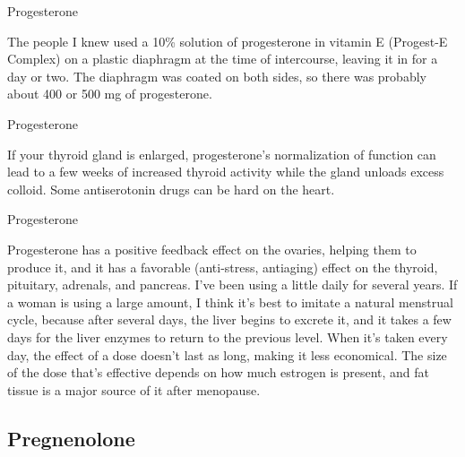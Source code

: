\documentclass[11pt,oneside,openany,extrafontsizes]{memoir}
\begin{document}
\begin{standalonequote}{Progesterone}

    \begin{answer}
      The people I knew used a 10\% solution of progesterone in vitamin E (Progest-E Complex) on a plastic diaphragm at the time of intercourse, leaving it in for a day or two. The diaphragm was coated on both sides, so there was probably about 400 or 500 mg of progesterone.
    \end{answer}
\end{standalonequote}

\begin{standalonequote}{Progesterone}

    \begin{answer}
      If your thyroid gland is enlarged, progesterone's normalization of function can lead to a few weeks of increased thyroid activity while the gland unloads excess colloid. Some antiserotonin drugs can be hard on the heart.
    \end{answer}
\end{standalonequote}

\begin{standalonequote}{Progesterone}

    \begin{answer}
       Progesterone has a positive feedback effect on the ovaries, helping them to produce it, and it has a favorable (anti-stress, antiaging) effect on the thyroid, pituitary, adrenals, and pancreas. I've been using a little daily for several years. If a woman is using a large amount, I think it's best to imitate a natural menstrual cycle, because after several days, the liver begins to excrete it, and it takes a few days for the liver enzymes to return to the previous level. When it's taken every day, the effect of a dose doesn't last as long, making it less economical. The size of the dose that's effective depends on how much estrogen is present, and fat tissue is a major source of it after menopause. 
    \end{answer}
\end{standalonequote}

\subsection{Pregnenolone}
\end{document}
